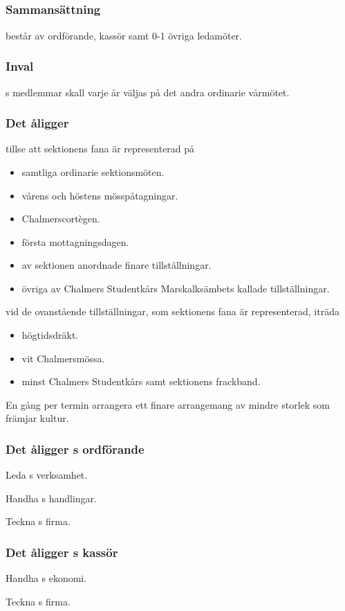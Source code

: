 \subsection{\FANBARERITFULL}
\subsubsection{Sammansättning}
\FANBARERIT{} består av ordförande, kassör samt 0-1 övriga ledamöter.

\subsubsection{Inval}
\FANBARERIT{}s medlemmar skall varje år väljas på det andra ordinarie vårmötet.

\subsubsection{Det åligger \FANBARERIT}
\label{sec:fanbarerit:function}
\begin{att}
	\item tillse att sektionens fana är representerad på
	\begin{itemize}
		\item samtliga ordinarie sektionsmöten.
		\item vårens och höstens mösspåtagningar.
		\item Chalmerscortègen.
		\item första mottagningsdagen.
		\item av sektionen anordnade finare tillställningar.
		\item övriga av Chalmers Studentkårs Marskalksämbets kallade tillställningar.
	\end{itemize}
	\item vid de ovanstående tillställningar, som sektionens fana är representerad, iträda
	\begin{itemize}
		\item högtidsdräkt.
		\item vit Chalmersmössa.
		\item minst Chalmers Studentkårs samt sektionens frackband.
	\end{itemize}
	\item En gång per termin arrangera ett finare arrangemang av mindre storlek som främjar kultur.
\end{att}

\subsubsection{Det åligger \FANBARERIT{}s ordförande}
\begin{att}
	\item Leda \FANBARERIT{}s verksamhet.
	\item Handha \FANBARERIT{}s handlingar.
	\item Teckna \FANBARERIT{}s firma.
\end{att}

\subsubsection{Det åligger \FANBARERIT{}s kassör}
\begin{att}
	\item Handha \FANBARERIT{}s ekonomi.
	\item Teckna \FANBARERIT{}s firma.
\end{att}


